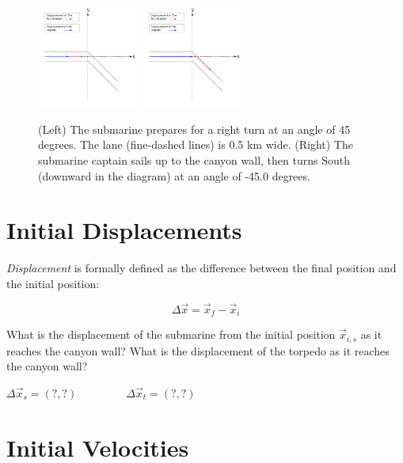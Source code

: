 \documentclass{article}
\begin{document}
\begin{figure}[hb]
\centering
\includegraphics[width=0.3\textwidth]{TheHuntForRedOctober1.pdf}
\includegraphics[width=0.3\textwidth]{TheHuntForRedOctober2.pdf}
\caption{\label{fig:hunt1}  (Left) The submarine prepares for a right turn at an angle of 45 degrees.  The lane (fine-dashed lines) is 0.5 km wide. (Right) The submarine captain sails up to the canyon wall, then turns South (downward in the diagram) at an angle of -45.0 degrees.}
\end{figure}

\section{Initial Displacements}

\textit{Displacement} is formally defined as the difference between the final position and the initial position:

\begin{equation}
\Delta \vec{x} = \vec{x}_f - \vec{x}_i
\end{equation}

What is the displacement of the submarine from the initial position $\vec{x}_{i,s}$ as it reaches the canyon wall?  What is the displacement of the torpedo as it reaches the canyon wall? \\ \vspace{1cm}

$\Delta \vec{x}_s = (?,?) ~~~~~~~~~~~~~~~~~~~~ \Delta \vec{x}_t = (?,?)$

\section{Initial Velocities}
\end{document}
